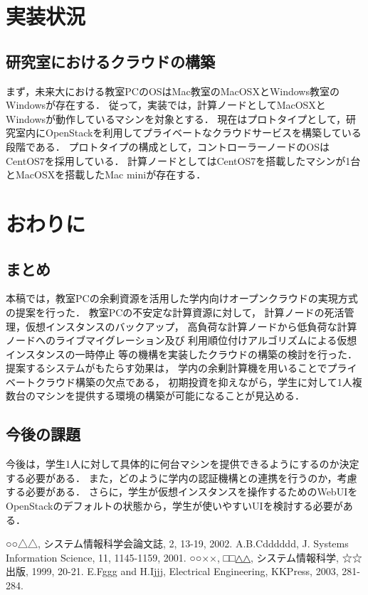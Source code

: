 \documentclass[11pt,a4paper]{jsarticle}
\begin{document}
\section{実装状況}
\subsection{研究室におけるクラウドの構築}
まず，未来大における教室PCのOSはMac教室のMacOSXとWindows教室のWindowsが存在する．
従って，実装では，計算ノードとしてMacOSXとWindowsが動作しているマシンを対象とする．
現在はプロトタイプとして，研究室内にOpenStackを利用してプライベートなクラウドサービスを構築している段階である．
プロトタイプの構成として，コントローラーノードのOSはCentOS7を採用している．
計算ノードとしてはCentOS7を搭載したマシンが1台とMacOSXを搭載したMac miniが存在する．

\section{おわりに}
\subsection{まとめ}
本稿では，教室PCの余剰資源を活用した学内向けオープンクラウドの実現方式の提案を行った．
教室PCの不安定な計算資源に対して，
計算ノードの死活管理，仮想インスタンスのバックアップ，
高負荷な計算ノードから低負荷な計算ノードへのライブマイグレーション及び
利用順位付けアルゴリズムによる仮想インスタンスの一時停止
等の機構を実装したクラウドの構築の検討を行った．
提案するシステムがもたらす効果は，
学内の余剰計算機を用いることでプライベートクラウド構築の欠点である，
初期投資を抑えながら，学生に対して1人複数台のマシンを提供する環境の構築が可能になることが見込める．
\subsection{今後の課題}
今後は，学生1人に対して具体的に何台マシンを提供できるようにするのか決定する必要がある．
また，どのように学内の認証機構との連携を行うのか，考慮する必要がある．
さらに，学生が仮想インスタンスを操作するためのWebUIをOpenStackのデフォルトの状態から，学生が使いやすいUIを検討する必要がある．

\begin{thebibliography}{99}
	○○△△, システム情報科学会論文誌, 2, 13-19, 2002.
	A.B.Cdddddd, J. Systems Information Science, 11, 1145-1159, 2001.
	○○××, □□△△, システム情報科学, ☆☆出版, 1999, 20-21.
	E.Fggg and H.Ijjj, Electrical Engineering, KKPress, 2003, 281-284.
\end{thebibliography}
\end{document}
